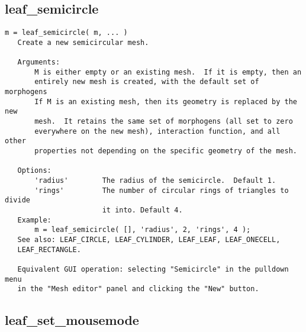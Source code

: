 \subsection{leaf\_semicircle}\label{section-leaf-semicircle}

\begin{verbatim}
m = leaf_semicircle( m, ... )
   Create a new semicircular mesh.

   Arguments:
       M is either empty or an existing mesh.  If it is empty, then an
       entirely new mesh is created, with the default set of morphogens
       If M is an existing mesh, then its geometry is replaced by the new
       mesh.  It retains the same set of morphogens (all set to zero
       everywhere on the new mesh), interaction function, and all other
       properties not depending on the specific geometry of the mesh.

   Options:
       'radius'        The radius of the semicircle.  Default 1.
       'rings'         The number of circular rings of triangles to divide
                       it into. Default 4.
   Example:
       m = leaf_semicircle( [], 'radius', 2, 'rings', 4 );
   See also: LEAF_CIRCLE, LEAF_CYLINDER, LEAF_LEAF, LEAF_ONECELL,
   LEAF_RECTANGLE.

   Equivalent GUI operation: selecting "Semicircle" in the pulldown menu
   in the "Mesh editor" panel and clicking the "New" button.
\end{verbatim}

\subsection{leaf\_set\_mousemode}\label{section-leaf-set-mousemode}

